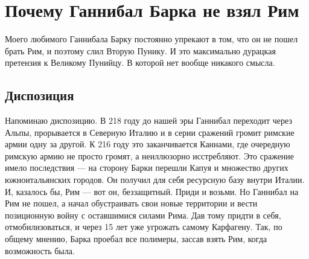 \chapter{Почему Ганнибал Барка не взял Рим}

Моего любимого Ганнибала Барку постоянно упрекают в том, что он не пошел брать Рим, и поэтому слил Вторую Пунику. И это максимально дурацкая претензия к Великому Пунийцу. В которой нет вообще никакого смысла.

\section{Диспозиция}
Напоминаю диспозицию. В 218 году до нашей эры Ганнибал переходит через Альпы, прорывается в Северную Италию и в серии сражений громит римские армии одну за другой. К 216 году это заканчивается Каннами, где очередную римскую армию не просто громят, а неиллюзорно исстребляют. Это сражение имело последствия — на сторону Барки перешли Капуя и множество других южноитальянских городов. Он получил для себя ресурсную базу внутри Италии. И, казалось бы, Рим — вот он, беззащитный. Приди и возьми. Но Ганнибал на Рим не пошел, а начал обустраивать свои новые территории и вести позиционную войну с оставшимися силами Рима. Дав тому придти в себя, отмобилизоваться, и через 15 лет уже угрожать самому Карфагену. Так, по общему мнению, Барка проебал все полимеры, зассав взять Рим, когда возможность была.


